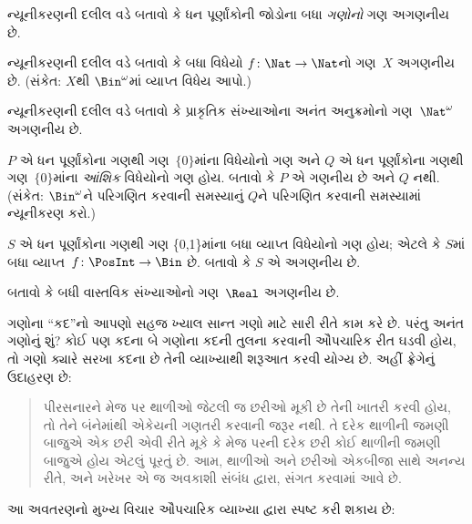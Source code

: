 \begin{prob}
ન્યૂનીકરણની દલીલ વડે બતાવો કે ધન પૂર્ણાંકોની જોડોના બધા
\emph{ગણોનો} ગણ અગણનીય છે.
\end{prob}

\begin{prob}\label{sfr:siz:red:prob:nat-nat}
  ન્યૂનીકરણની દલીલ વડે બતાવો કે બધા વિધેયો
  $f\colon \Nat \to \Nat$નો ગણ~$X$ અગણનીય છે.
  (સંકેત: $X$થી $\Bin^\omega$માં વ્યાપ્ત વિધેય આપો.)
\end{prob}

\begin{prob}
ન્યૂનીકરણની દલીલ વડે બતાવો કે પ્રાકૃતિક સંખ્યાઓના અનંત
અનુક્રમોનો ગણ~$\Nat^\omega$ અગણનીય છે.
\end{prob}

\begin{prob}
$P$ એ ધન પૂર્ણાંકોના ગણથી ગણ~$\{0\}$માંના વિધેયોનો ગણ અને
$Q$ એ ધન પૂર્ણાંકોના ગણથી ગણ~$\{0\}$માંના \emph{આંશિક}
વિધેયોનો ગણ હોય. બતાવો કે $P$ એ ગણનીય છે અને $Q$ નથી.
(સંકેત: $\Bin^\omega$ને પરિગણિત કરવાની સમસ્યાનું $Q$ને
પરિગણિત કરવાની સમસ્યામાં ન્યૂનીકરણ કરો.)
\end{prob}

\begin{prob}
$S$ એ ધન પૂર્ણાંકોના ગણથી ગણ \{0,1\}માંના બધા
વ્યાપ્ત વિધેયોનો ગણ હોય; એટલે કે $S$માં બધા
વ્યાપ્ત~$f\colon \PosInt \to \Bin$ છે. બતાવો કે $S$ એ
અગણનીય છે.
\end{prob}

\begin{prob}
બતાવો કે બધી વાસ્તવિક સંખ્યાઓનો ગણ~$\Real$ અગણનીય છે.
\end{prob}
\endgroup


\begingroup
\makeatletter{}\makeatother


\label{guunit:OLP-0035}


ગણોના ``કદ''નો આપણો સહજ ખ્યાલ સાન્ત ગણો માટે સારી રીતે
કામ કરે છે. પરંતુ અનંત ગણોનું શું? કોઈ પણ કદના બે ગણોના કદની
તુલના કરવાની ઔપચારિક રીત ઘડવી હોય, તો ગણો ક્યારે સરખા કદના છે
તેની વ્યાખ્યાથી શરૂઆત કરવી યોગ્ય છે. અહીં ફ્રેગેનું ઉદાહરણ છે:
\begin{quote}
  પીરસનારને મેજ પર થાળીઓ જેટલી જ છરીઓ મૂકી છે તેની ખાતરી કરવી
  હોય, તો તેને બંનેમાંથી એકેયની ગણતરી કરવાની જરૂર નથી. તે દરેક
  થાળીની જમણી બાજુએ એક છરી એવી રીતે મૂકે કે મેજ પરની દરેક છરી
  કોઈ થાળીની જમણી બાજુએ હોય એટલું પૂરતું છે. આમ, થાળીઓ અને
  છરીઓ એકબીજા સાથે અનન્ય રીતે, અને ખરેખર એ જ અવકાશી સંબંધ
  દ્વારા, સંગત કરવામાં આવે છે. \citep[\S70]{Frege1884}
\end{quote}
આ અવતરણનો મુખ્ય વિચાર ઔપચારિક વ્યાખ્યા દ્વારા સ્પષ્ટ કરી શકાય છે:

